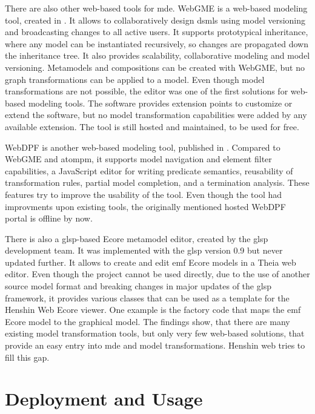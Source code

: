 \documentclass[conference,onecolumn]{IEEEtran}
\begin{document}
  There are also other web-based tools for \ac{mde}. WebGME \cite{webGME} is a web-based modeling tool, created in \citeyear{webGME}. It allows to collaboratively design \acp{dsml} using model versioning and broadcasting changes to all active users. It supports prototypical inheritance, where any model can be instantiated recursively, so changes are propagated down the inheritance tree. It also provides scalability, collaborative modeling and model versioning. Metamodels and compositions can be created with WebGME, but no graph transformations can be applied to a model. Even though model transformations are not possible, the editor was one of  the first solutions for web-based modeling tools. \cite{webGME} The software provides extension points to customize or extend the software, but no model transformation capabilities were added by any available extension. \cite{webgme-website} The tool is still hosted and maintained, to be used for free. \cite{webgme-website}


  WebDPF \cite{webDPF} is another web-based modeling tool, published in \citeyear{webDPF}. Compared to WebGME and \ac{atompm}, it supports model navigation and element filter capabilities, a JavaScript editor for writing predicate semantics, reusability of transformation rules, partial model completion, and a termination analysis. These features try to improve the usability of the tool. \cite{webDPF} Even though the tool had improvments upon existing tools, the originally mentioned hosted WebDPF portal is offline by now. 


  There is also a \ac{glsp}-based Ecore metamodel editor, created by the \ac{glsp} development team. It was implemented with the \ac{glsp} version 0.9 but never updated further. It allows to create and edit \ac{emf} Ecore models in a Theia web editor. Even though the project cannot be used directly, due to the use of another source model format and breaking changes in major updates of the \ac{glsp} framework, it provides various classes that can be used as a template for the Henshin Web Ecore viewer. One example is the factory code that maps the \ac{emf} Ecore model to the graphical model. \cite{glsp-ecore-repo}
  The findings show, that there are many existing model transformation tools, but only very few web-based solutions, that provide an easy entry into \ac{mde} and model transformations. Henshin web tries to fill this gap.

  \section{Deployment and Usage}
  \label{sec:deployment}
\end{document}
